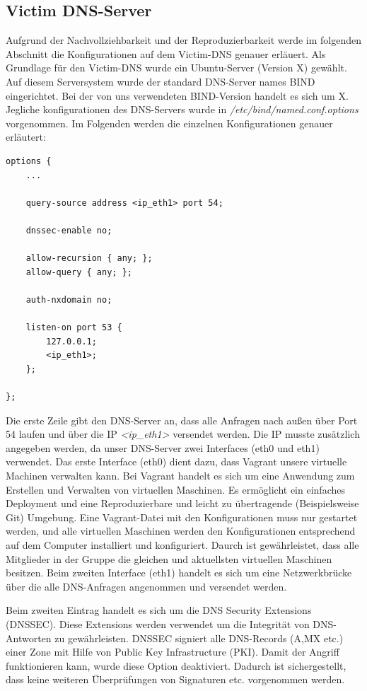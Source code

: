 \documentclass[10pt,a4paper]{article}
\begin{document}
\subsection{Victim DNS-Server}
Aufgrund der Nachvollziehbarkeit und der Reproduzierbarkeit werde im folgenden Abschnitt die Konfigurationen auf dem Victim-DNS genauer erläuert. Als Grundlage für den Victim-DNS wurde ein Ubuntu-Server (Version X) gewählt. Auf diesem Serversystem wurde der standard DNS-Server names BIND eingerichtet. Bei der von uns verwendeten BIND-Version handelt es sich um X. Jegliche konfigurationen des DNS-Servers wurde in \emph{/etc/bind/named.conf.options} vorgenommen. Im Folgenden werden die einzelnen Konfigurationen genauer erläutert:
\begin{center}
\begin{lstlisting}
options {
    ...

    query-source address <ip_eth1> port 54;

    dnssec-enable no;

    allow-recursion { any; };
    allow-query { any; };

    auth-nxdomain no;

    listen-on port 53 {
        127.0.0.1;
        <ip_eth1>;
    };

};
\end{lstlisting}
\end{center}

Die erste Zeile gibt den DNS-Server an, dass alle Anfragen nach außen über Port 54 laufen und über die IP \emph{<ip\_eth1>} versendet werden. Die IP musste zusätzlich angegeben werden, da unser DNS-Server zwei Interfaces (eth0 und eth1) verwendet. Das erste Interface (eth0) dient dazu, dass Vagrant unsere virtuelle Machinen verwalten kann. Bei Vagrant handelt es sich um eine Anwendung zum Erstellen und Verwalten von virtuellen Maschinen. Es ermöglicht ein einfaches Deployment und eine Reproduzierbare und leicht zu übertragende (Beispielsweise Git) Umgebung. Eine Vagrant-Datei mit den Konfigurationen muss nur gestartet werden, und alle virtuellen Maschinen werden den Konfigurationen entsprechend auf dem Computer installiert und konfiguriert. Daurch ist gewährleistet, dass alle Mitglieder in der Gruppe die gleichen und aktuellsten virtuellen Maschinen besitzen. Beim zweiten Interface (eth1) handelt es sich um eine Netzwerkbrücke über die alle DNS-Anfragen angenommen und versendet werden.

Beim zweiten Eintrag handelt es sich um die DNS Security Extensions (DNSSEC). Diese Extensions werden verwendet um die Integrität von DNS-Antworten zu gewährleisten. DNSSEC signiert alle DNS-Records (A,MX etc.) einer Zone mit Hilfe von Public Key Infrastructure (PKI). Damit der Angriff funktionieren kann, wurde diese Option deaktiviert. Dadurch ist sichergestellt, dass keine weiteren Überprüfungen von Signaturen etc. vorgenommen werden.
\end{document}
